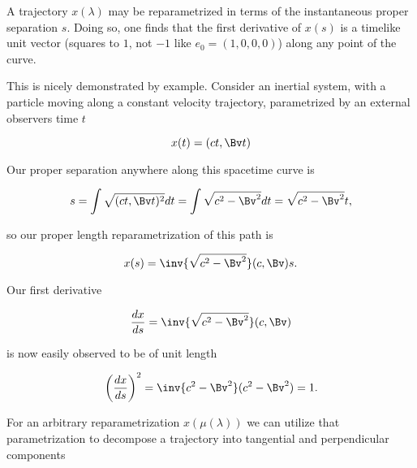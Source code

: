 \documentclass[iop,tighten]{emulateapj}
\begin{document}
A trajectory $x(\lambda)$ may be reparametrized in terms of the instantaneous proper separation $s$.  Doing so, one finds that the first derivative of $x(s)$ is a timelike unit vector (squares to $1$, not $-1$ like $e_0 = (1, 0, 0, 0)$) along any point of the curve.

This is nicely demonstrated by example.
%
%
Consider an inertial system, with a particle moving along a constant velocity trajectory, parametrized by an external observers time $t$

\begin{equation}\label{eqn:grahamSchmidtLorentz:440}
x(t) = (c t, \Bv t)
\end{equation}

Our proper separation anywhere along this spacetime curve is

\begin{equation}\label{eqn:grahamSchmidtLorentz:460}
s = \int \sqrt{(c t, \Bv t)^2} dt = \int \sqrt{ c^2 - \Bv^2 } dt = \sqrt{ c^2 - \Bv^2 } t,
\end{equation}

so our proper length reparametrization of this path is

\begin{equation}\label{eqn:grahamSchmidtLorentz:480}
x(s) = \inv{\sqrt{c^2 - \Bv^2}} (c, \Bv) s.
\end{equation}

Our first derivative

\begin{equation}\label{eqn:grahamSchmidtLorentz:500}
\frac{dx}{ds} = \inv{\sqrt{c^2 - \Bv^2}} (c, \Bv) 
\end{equation}

is now easily observed to be of unit length 

\begin{equation}\label{eqn:grahamSchmidtLorentz:520}
\left( \frac{dx}{ds} \right)^2 = \inv{c^2 - \Bv^2} (c^2 - \Bv^2) = 1.
\end{equation}

For an arbitrary reparametrization $x(\mu(\lambda))$ we can utilize that parametrization to decompose a trajectory into tangential and perpendicular components
\end{document}
